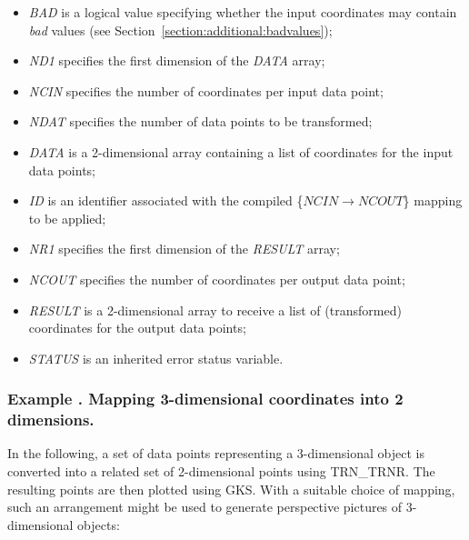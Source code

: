 \documentclass[twoside,nolof,11pt]{starlink}
\providecommand{\name}[1]{\small{#1}}
\providecommand{\fortvar}[1]{\emph{#1}}
\newcounter{examplecounter}
\providecommand{\example}[1]{\addtocounter{examplecounter}{1}
                         \subsubsection*{Example \theexamplecounter. #1}}
\begin{document}
\begin{itemize}

\item \fortvar{BAD} is a logical value specifying whether the input
coordinates may contain \emph{bad} values (see
Section~\ref{section:additional:badvalues});

\item \fortvar{ND1} specifies the first dimension of the \fortvar{DATA}
array;

\item \fortvar{NCIN} specifies the number of coordinates per input data
point;

\item \fortvar{NDAT} specifies the number of data points to be transformed;

\item \fortvar{DATA} is a 2-dimensional array containing a list of
coordinates for the input data points;

\item \fortvar{ID} is an identifier associated with the compiled
\mbox{\{$NCIN \rightarrow NCOUT$\}} mapping to be applied;

\item \fortvar{NR1} specifies the first dimension of the \fortvar{RESULT}
array;

\item \fortvar{NCOUT} specifies the number of coordinates per output data
point;

\item \fortvar{RESULT} is a 2-dimensional array to receive a list of
(transformed) coordinates for the output data points;

\item \fortvar{STATUS} is an inherited error status variable.

\end{itemize}

\example{Mapping 3-dimensional coordinates into 2 dimensions.}
In the following, a set of data points representing a 3-dimensional object
is converted into a related set of 2-dimensional points using
\name{TRN\_TRNR}.
The resulting points are then plotted using \name{GKS}.
With a suitable choice of mapping, such an arrangement might be used to
generate perspective pictures of 3-dimensional objects:
\end{document}
